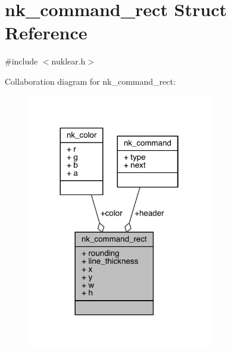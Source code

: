 \hypertarget{structnk__command__rect}{}\section{nk\+\_\+command\+\_\+rect Struct Reference}
\label{structnk__command__rect}


{\ttfamily \#include $<$nuklear.\+h$>$}



Collaboration diagram for nk\+\_\+command\+\_\+rect\+:
\nopagebreak
\begin{figure}[H]
\begin{center}
\leavevmode
\includegraphics[width=228pt]{structnk__command__rect__coll__graph}
\end{center}
\end{figure}
